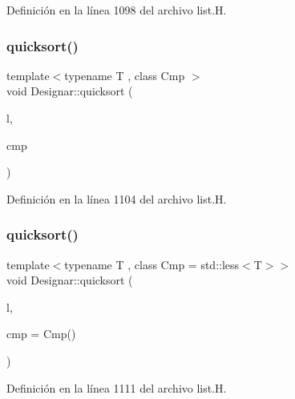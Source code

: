 Definición en la línea 1098 del archivo list.\+H.

\mbox{\label{namespace_designar_abdb3fae2c35a0696dfb66711eb224f5a}} 
\subsubsection{\texorpdfstring{quicksort()}{quicksort()}\hspace{0.1cm}{\footnotesize\ttfamily [8/14]}}
{\footnotesize\ttfamily template$<$typename T , class Cmp $>$ \\
void Designar\+::quicksort (\begin{DoxyParamCaption}\item[{\hyperlink{class_designar_1_1_d_l_list}{D\+L\+List}$<$ T $>$ \&}]{l,  }\item[{Cmp \&}]{cmp }\end{DoxyParamCaption})\hspace{0.3cm}{\ttfamily [inline]}}



Definición en la línea 1104 del archivo list.\+H.

\mbox{\label{namespace_designar_a199363a09da37dd34fdf7d151441fa44}} 
\subsubsection{\texorpdfstring{quicksort()}{quicksort()}\hspace{0.1cm}{\footnotesize\ttfamily [9/14]}}
{\footnotesize\ttfamily template$<$typename T , class Cmp  = std\+::less$<$\+T$>$$>$ \\
void Designar\+::quicksort (\begin{DoxyParamCaption}\item[{\hyperlink{class_designar_1_1_d_l_list}{D\+L\+List}$<$ T $>$ \&}]{l,  }\item[{Cmp \&\&}]{cmp = {\ttfamily Cmp()} }\end{DoxyParamCaption})\hspace{0.3cm}{\ttfamily [inline]}}



Definición en la línea 1111 del archivo list.\+H.

\mbox{\label{namespace_designar_af359499060a9d2b8e282ae9def049e17}} 
